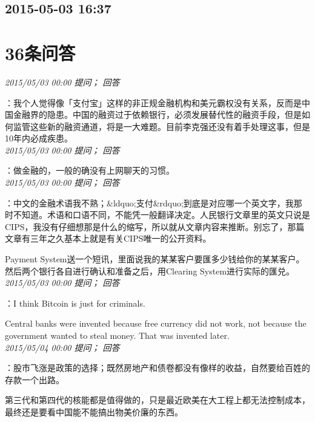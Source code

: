 \documentclass[twocolumn]{ctexart}
\begin{document}
\subsection{2015-05-03 16:37}


\section{36条问答}

\textit{\hfill\noindent\small 2015/05/03 00:00 提问； 回答}

：我个人觉得像「支付宝」这样的非正规金融机构和美元霸权没有关系，反而是中国金融界的隐患。中国的融资过于依赖银行，必须发展替代性的融资手段，但是如何监管这些新的融资通道，将是一大难题。目前李克强还没有着手处理这事，但是10年内必成疾患。\\

\textit{\hfill\noindent\small 2015/05/03 00:00 提问； 回答}

：做金融的，一般的确没有上网聊天的习惯。\\

\textit{\hfill\noindent\small 2015/05/03 00:00 提问； 回答}

：中文的金融术语我不熟；\&ldquo;支付\&rdquo;到底是对应哪一个英文字，我那时不知道。术语和口语不同，不能凭一般翻译决定。人民银行文章里的英文只说是CIPS，我没有仔细想那是什么的缩写，所以就从文章内容来推断。别忘了，那篇文章有三年之久基本上就是有关CIPS唯一的公开资料。

Payment System送一个短讯，里面说我的某某客户要匯多少钱给你的某某客户。然后两个银行各自进行确认和准备之后，用Clearing System进行实际的匯兑。\\

\textit{\hfill\noindent\small 2015/05/03 00:00 提问； 回答}

：I think Bitcoin is just for criminals.

Central banks were invented because free currency did not work, not because the government wanted to steal money. That was invented later.\\

\textit{\hfill\noindent\small 2015/05/04 00:00 提问； 回答}

：股市飞涨是政策的选择；既然房地产和债卷都没有像样的收益，自然要给百姓的存款一个出路。

第三代和第四代的核能都是值得做的，只是最近欧美在大工程上都无法控制成本，最终还是要看中国能不能搞出物美价廉的东西。\\
\end{document}
